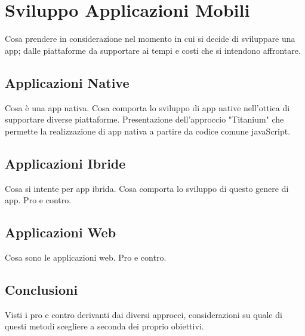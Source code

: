 \chapter{Sviluppo Applicazioni Mobili}
	Cosa prendere in considerazione nel momento in cui si decide di sviluppare
	una app; dalle piattaforme da supportare ai tempi e costi che si intendono
	affrontare.
	
	\section{Applicazioni Native}
		Cosa è una app nativa. Cosa comporta lo sviluppo di app native
		nell'ottica di supportare diverse piattaforme. Presentazione
		dell'approccio "Titanium" che permette la realizzazione di app nativa a
		partire da codice comune javaScript.
		
	\section{Applicazioni Ibride}
		Cosa si intente per app ibrida. Cosa comporta lo sviluppo di questo
		genere di app. Pro e contro.
		
	\section{Applicazioni Web}
		Cosa sono le applicazioni web. Pro e contro.
		
	\section{Conclusioni}
		Visti i pro e contro derivanti dai diversi approcci, considerazioni su
		quale di questi metodi scegliere a seconda dei proprio obiettivi.
		
	